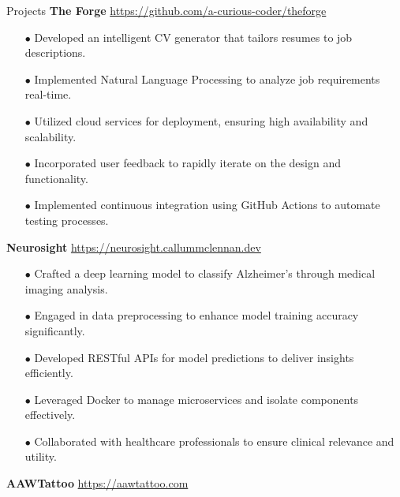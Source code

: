 \begin{rSection}{Projects}
\vspace{0.12cm}
{\bf The Forge}
\hspace{2 cm}{AI, Python, GitHub}
\hfill{\href{https://github.com/a-curious-coder/theforge}{https://github.com/a-curious-coder/theforge}}
\begin{itemize}[label=\myfancylabel, leftmargin=0.5cm, topsep=-5pt, itemsep=-1ex]
\setlength\itemsep{-0.25cm}
    \item[$\bullet$] Developed an intelligent CV generator that tailors resumes to job descriptions.
    \item[$\bullet$] Implemented Natural Language Processing to analyze job requirements real-time.
    \item[$\bullet$] Utilized cloud services for deployment, ensuring high availability and scalability.
    \item[$\bullet$] Incorporated user feedback to rapidly iterate on the design and functionality.
    \item[$\bullet$] Implemented continuous integration using GitHub Actions to automate testing processes.
\end{itemize}
\vspace{0.12cm}
{\bf Neurosight}
\hspace{2 cm}{Deep Learning, Python, Flask}
\hfill{\href{https://neurosight.callummclennan.dev}{https://neurosight.callummclennan.dev}}
\begin{itemize}[label=\myfancylabel, leftmargin=0.5cm, topsep=-5pt, itemsep=-1ex]
\setlength\itemsep{-0.25cm}
    \item[$\bullet$] Crafted a deep learning model to classify Alzheimer's through medical imaging analysis.
    \item[$\bullet$] Engaged in data preprocessing to enhance model training accuracy significantly.
    \item[$\bullet$] Developed RESTful APIs for model predictions to deliver insights efficiently.
    \item[$\bullet$] Leveraged Docker to manage microservices and isolate components effectively.
    \item[$\bullet$] Collaborated with healthcare professionals to ensure clinical relevance and utility.
\end{itemize}
\vspace{0.12cm}
{\bf AAWTattoo}
\hspace{2 cm}{Django, Python}
\hfill{\href{https://aawtattoo.com}{https://aawtattoo.com}}

\end{rSection}
